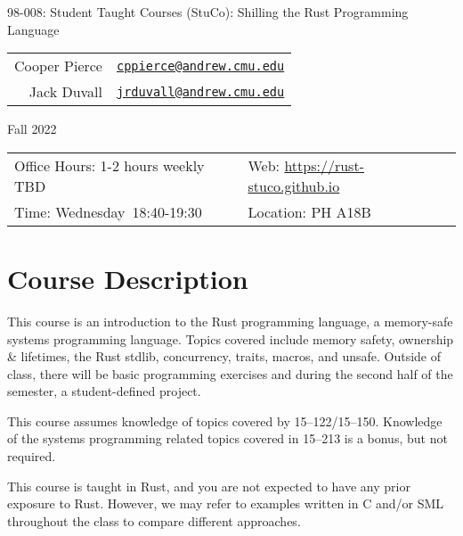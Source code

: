 \documentclass{article}
\newcommand{\longcoursename}{
    Student Taught Courses (StuCo): Shilling the Rust Programming Language
}
\newcommand{\courselocation}{PH A18B}
\newcommand{\meetingstarttime}{18:40}
\newcommand{\meetingendtime}{19:30}
\newcommand{\meetingdays}{Wednesday}
\newcommand{\longsemester}{Fall 2022}
\newcommand{\deptcode}{98}
\newcommand{\coursecode}{008}
\newcommand{\fullcoursecode}{\deptcode-\coursecode}
\begin{document}
\thispagestyle{empty}
\begin{center}
\begin{minipage}{.85\textwidth}
    \centering
    {\huge {\fullcoursecode: \longcoursename}}

    \vspace{1em}

    \begin{tabular}{@{}rl@{}}
        Cooper Pierce & \href{mailto:cppierce@andrew.cmu.edu}{\texttt{cppierce@andrew.cmu.edu}} \\ 
        Jack Duvall & \href{mailto:jrduvall@andrew.cmu.edu}{\texttt{jrduvall@andrew.cmu.edu}} \\
    \end{tabular}

    \vspace{1em}

    \longsemester
\end{minipage}
\end{center}

\vspace{3em}


\begin{tabular*}{.93\textwidth}{@{\extracolsep{\fill}}ll}
    \toprule
    Office Hours: 1-2 hours weekly TBD & Web: \url{https://rust-stuco.github.io} \\
    Time: \meetingdays\ \meetingstarttime-\meetingendtime & Location: \courselocation \\
    \bottomrule
\end{tabular*}

\vspace{5em}

\section*{Course Description}

This course is an introduction to the Rust programming language, a memory-safe
systems programming language. Topics covered include memory safety, ownership \&
lifetimes, the Rust stdlib, concurrency, traits, macros, and unsafe. Outside of
class, there will be basic programming exercises and during the second half of
the semester, a student-defined project.

This course assumes knowledge of topics covered by 15--122/15--150. Knowledge of
the systems programming related topics covered in 15--213 is a bonus, but not
required.

This course is taught in Rust, and you are not expected to have any prior
exposure to Rust. However, we may refer to examples written in C and/or SML
throughout the class to compare different approaches.
\end{document}
